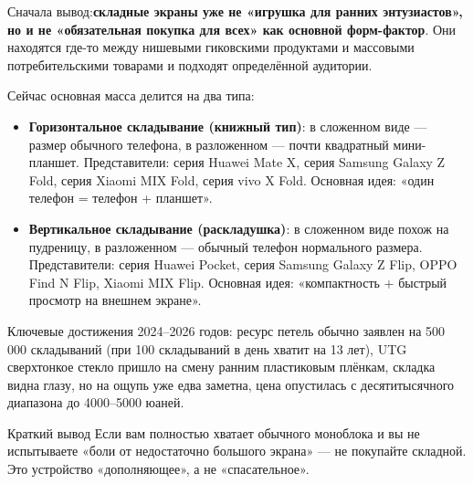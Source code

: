 


Сначала вывод:\textbf{складные экраны уже не «игрушка для ранних энтузиастов», но и не «обязательная покупка для всех» как основной форм-фактор}. Они находятся где-то между нишевыми гиковскими продуктами и массовыми потребительскими товарами и подходят определённой аудитории.

Сейчас основная масса делится на два типа:

\begin{itemize}
  \item \textbf{Горизонтальное складывание (книжный тип)}: в сложенном виде — размер обычного телефона, в разложенном — почти квадратный мини-планшет. Представители: серия Huawei Mate X, серия Samsung Galaxy Z Fold, серия Xiaomi MIX Fold, серия vivo X Fold. Основная идея: «один телефон = телефон + планшет».
  \item \textbf{Вертикальное складывание (раскладушка)}: в сложенном виде похож на пудреницу, в разложенном — обычный телефон нормального размера. Представители: серия Huawei Pocket, серия Samsung Galaxy Z Flip, OPPO Find N Flip, Xiaomi MIX Flip. Основная идея: «компактность + быстрый просмотр на внешнем экране».
\end{itemize}

Ключевые достижения 2024–2026 годов: ресурс петель обычно заявлен на 500 000 складываний (при 100 складываний в день хватит на 13 лет), UTG сверхтонкое стекло пришло на смену ранним пластиковым плёнкам, складка видна глазу, но на ощупь уже едва заметна, цена опустилась с десятитысячного диапазона до 4000–5000 юаней.

\begin{tcbinfo}{Краткий вывод}
Если вам полностью хватает обычного моноблока и вы не испытываете «боли от недостаточно большого экрана» — не покупайте складной. Это устройство «дополняющее», а не «спасательное».

\end{tcbinfo}


